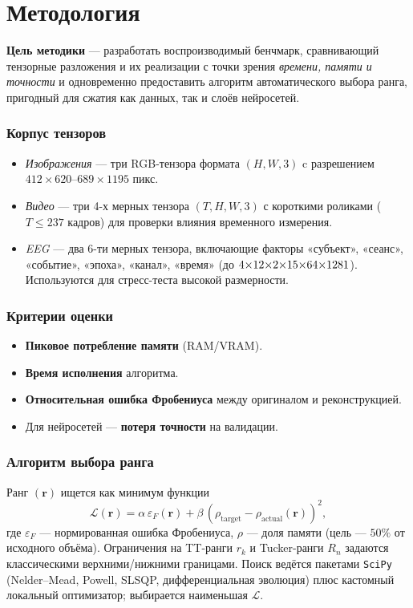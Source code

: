 \chapter{Методология}
\label{chap:methodology}

\textbf{Цель методики} — разработать воспроизводимый бенчмарк, сравнивающий тензорные разложения и их реализации с точки зрения \emph{времени, памяти и точности} и одновременно предоставить алгоритм автоматического выбора ранга, пригодный для сжатия как данных, так и слоёв нейросетей.

\subsection*{Корпус тензоров}
\begin{itemize}\setlength\itemsep{0.15em}
    \item \emph{Изображения} — три RGB-тензора формата \((H,W,3)\) c разрешением $412\!\times\!620$–$689\!\times\!1195$ пикс.  
    \item \emph{Видео} — три 4-х мерных тензора \((T,H,W,3)\) с короткими роликами ($T\le 237$ кадров) для проверки влияния временного измерения.  
    \item \emph{EEG} — два 6-ти мерных тензора, включающие факторы «субъект», «сеанс», «событие», «эпоха», «канал», «время» (до $4{\small\times}12{\small\times}2{\small\times}15{\small\times}64{\small\times}1281$).  Используются для стресс-теста высокой размерности.
\end{itemize}

\subsection*{Критерии оценки}
\begin{itemize}\setlength\itemsep{0.15em}
    \item \textbf{Пиковое потребление памяти} (RAM/VRAM).  
    \item \textbf{Время исполнения} алгоритма.  
    \item \textbf{Относительная ошибка Фробениуса} между оригиналом и реконструкцией.  
    \item Для нейросетей — \textbf{потеря точности} на валидации.
\end{itemize}

\subsection*{Алгоритм выбора ранга}
Ранг $(\mathbf r)$ ищется как минимум функции  
\[
\mathcal{L}(\mathbf r)=
\alpha\,\varepsilon_F(\mathbf r)+
\beta\,(\rho_{\text{target}}-\rho_{\text{actual}}(\mathbf r))^{2},
\]
где $\varepsilon_F$ — нормированная ошибка Фробениуса,  
$\rho$ — доля памяти (цель — $50\%$ от исходного объёма).  
Ограничения на TT-ранги $r_k$ и Tucker-ранги $R_n$ задаются классическими верхними/нижними границами.  
Поиск ведётся пакетами \texttt{SciPy} (Nelder–Mead, Powell, SLSQP, дифференциальная эволюция) плюс кастомный локальный оптимизатор; выбирается наименьшая $\mathcal{L}$.

